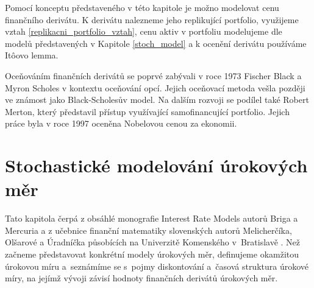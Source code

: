 \documentclass[a4paper,12pt]{report}
\theoremstyle{definition} \newtheorem{definice}[veta]{Definice}
\theoremstyle{remark}
\begin{document}

Pomocí konceptu představeného v této kapitole je možno modelovat cenu finančního derivátu.
K derivátu nalezneme jeho replikující portfolio, využijeme vztah \eqref{replikacni_portfolio_vztah}, cenu aktiv v portfoliu modelujeme dle modelů představených v Kapitole \ref{stoch_model} a k ocenění derivátu používáme It\^oovo lemma. 

Oceňováním finančních derivátů se poprvé zabývali v roce 1973 Fischer Black a Myron Scholes \cite{black1973pricing} v kontextu oceňování opcí. 
Jejich oceňovací metoda vešla později ve známost jako Black-Scholesův model.
Na dalším rozvoji se podílel také Robert Merton, který představil přístup využívající samofinancující portfolio.
Jejich práce byla v roce 1997 oceněna Nobelovou cenou za ekonomii.
 

\section{Stochastické modelování úrokových měr}\label{model_urok_miry_kap}
Tato kapitola čerpá z obsáhlé monografie Interest Rate Models autorů Briga a Mercuria \cite{brigo2007interest} a z učebnice finanční matematiky slovenských autorů Melicherčíka, Olšarové a Úradníčka působících na Univerzitě Komenského v~Bratislavě \cite{melichercik}.
Než začneme představovat konkrétní modely úrokových měr, definujeme okamžitou úrokovou míru a~seznámíme se s~pojmy diskontování a~časová struktura úrokové míry, na jejímž vývoji závisí hodnoty finančních derivátů úrokových měr.
\end{document}
